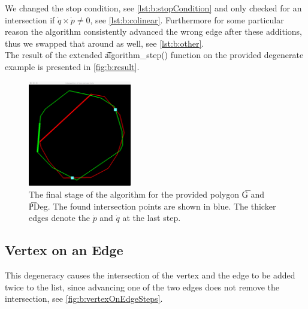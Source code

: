 We changed the stop condition, see \autoref{lst:b:stopCondition} and only checked for an intersection if $\dot{q} \times \dot{p} \neq 0$, see \autoref{lst:b:colinear}. Furthermore for some particular reason the algorithm consistently advanced the wrong edge after these additions, thus we swapped that around as well, see \autoref{lst:b:other}.\\







The result of the extended \t{algorithm_step()} function on the provided degenerate example is presented in \autoref{fig:b:result}.

		\begin{figure}
			\centering
			\includegraphics[width=0.4\textwidth]{./img/b_result}
			\caption{The final stage of the algorithm for the provided polygon \t{G} and \t{PDeg}. The found intersection points are shown in blue. The thicker edges denote the $\dot{p}$ and $\dot{q}$ at the last step.}
			\label{fig:b:result}
		\end{figure}	

\subsection*{Vertex on an Edge}
	This degeneracy causes the intersection of the vertex and the edge to be added twice to the list, since advancing one of the two edges does not remove the intersection, see \autoref{fig:b:vertexOnEdgeSteps}.

